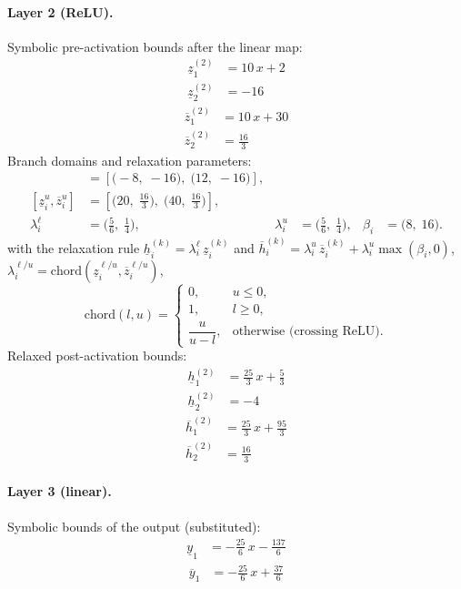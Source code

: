 \documentclass[11pt]{article}
\begin{document}
\paragraph{Layer 2 (ReLU).}
Symbolic pre-activation bounds after the linear map:
\begin{align*}
\underline{z}^{(2)}_{1} &= 10\,x + 2 \\
\underline{z}^{(2)}_{2} &= -16
\end{align*}
\begin{align*}
\overline{z}^{(2)}_{1} &= 10\,x + 30 \\
\overline{z}^{(2)}_{2} &= \frac{16}{3}
\end{align*}
Branch domains and relaxation parameters:
\begin{align*}
[\underline{z}^{\ell}_i, \overline{z}^{\ell}_i] &= [\bigl(-8,\; -16\bigr),\; \bigl(12,\; -16\bigr)], \\ 
[\underline{z}^{u}_i, \overline{z}^{u}_i] &= [\bigl(20,\; \frac{16}{3}\bigr),\; \bigl(40,\; \frac{16}{3}\bigr)], \\
\lambda^{\ell}_i &= \bigl(\frac{5}{6},\; \frac{1}{4}\bigr), & \lambda^{u}_i &= \bigl(\frac{5}{6},\; \frac{1}{4}\bigr), & \beta_i &= \bigl(8,\; 16\bigr).
\end{align*}
with the relaxation rule
$\underline{h}^{(k)}_i = \lambda^{\ell}_i\, \underline{z}^{(k)}_i$ and
$\overline{h}^{(k)}_i = \lambda^{u}_i\, \overline{z}^{(k)}_i + \lambda^{u}_i \max(\beta_i, 0)$,
$\lambda^{\ell/u}_i = \mathrm{chord}(\underline{z}_i^{\ell/u}, \overline{z}_i^{\ell/u})$,
\[
\mathrm{chord}(l, u) =
\begin{cases}
0, & u \le 0,\\
1, & l \ge 0,\\
\dfrac{u}{u - l}, & \text{otherwise (crossing ReLU)}.
\end{cases}\]
Relaxed post-activation bounds:
\begin{align*}
\underline{h}^{(2)}_{1} &= \frac{25}{3}\,x + \frac{5}{3} \\
\underline{h}^{(2)}_{2} &= -4
\end{align*}
\begin{align*}
\overline{h}^{(2)}_{1} &= \frac{25}{3}\,x + \frac{95}{3} \\
\overline{h}^{(2)}_{2} &= \frac{16}{3}
\end{align*}
\paragraph{Layer 3 (linear).}
Symbolic bounds of the output (substituted):
\begin{align*}
\underline{y}_{1} &= -\frac{25}{6}\,x - \frac{137}{6}
\end{align*}
\begin{align*}
\overline{y}_{1} &= -\frac{25}{6}\,x + \frac{37}{6}
\end{align*}
\end{document}
